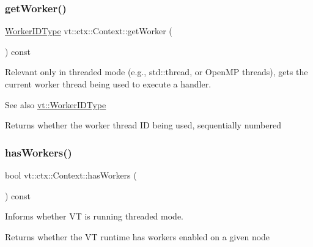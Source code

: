 \subsubsection{\texorpdfstring{get\+Worker()}{getWorker()}}
{\footnotesize\ttfamily \hyperlink{namespacevt_a656e362091da17b9b93d0655b36e3392}{Worker\+I\+D\+Type} vt\+::ctx\+::\+Context\+::get\+Worker (\begin{DoxyParamCaption}{ }\end{DoxyParamCaption}) const\hspace{0.3cm}{\ttfamily [inline]}}



Relevant only in threaded mode (e.\+g., {\ttfamily std\+::thread}, or Open\+MP threads), gets the current worker thread being used to execute a handler. 

\begin{DoxySeeAlso}{See also}
{\ttfamily \hyperlink{namespacevt_a656e362091da17b9b93d0655b36e3392}{vt\+::\+Worker\+I\+D\+Type}} 
\end{DoxySeeAlso}
\begin{DoxyReturn}{Returns}
whether the worker thread ID being used, sequentially numbered 
\end{DoxyReturn}
\mbox{\label{structvt_1_1ctx_1_1_context_a17b1fd9fd7bfc2afdd55707d1f321f76}} 
\subsubsection{\texorpdfstring{has\+Workers()}{hasWorkers()}}
{\footnotesize\ttfamily bool vt\+::ctx\+::\+Context\+::has\+Workers (\begin{DoxyParamCaption}{ }\end{DoxyParamCaption}) const\hspace{0.3cm}{\ttfamily [inline]}}



Informs whether VT is running threaded mode. 

\begin{DoxyReturn}{Returns}
whether the VT runtime has workers enabled on a given node 
\end{DoxyReturn}
\mbox{\label{structvt_1_1ctx_1_1_context_a78d9926c3f75b1296e81607fd303f8f1}} 
